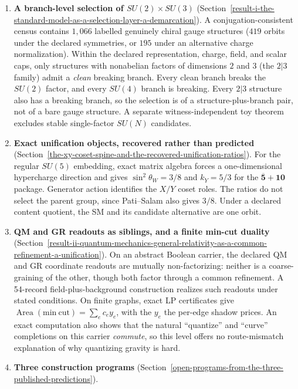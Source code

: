 \documentclass[11pt]{article}
\theoremstyle{definition}
\begin{document}
\begin{enumerate}
\item
  \textbf{A branch-level selection of \(SU(2)\times SU(3)\)} (Section~\ref{result-i-the-standard-model-as-a-selection-layer-a-demarcation}).
  A conjugation-consistent census contains \(1{,}066\) labelled genuinely chiral gauge structures (\(419\) orbits under
  the declared symmetries, or \(195\) under an alternative charge normalization). Within the declared representation,
  charge, field, and scalar caps, only structures with nonabelian factors of dimensions \(2\) and \(3\) (the
  \(2|3\) family) admit a \emph{clean} breaking branch. Every clean branch breaks the \(SU(2)\) factor, and every
  \(SU(4)\) branch is breaking. Every \(2|3\) structure also has a breaking branch, so the selection is of a
  structure-plus-branch pair, not of a bare gauge structure. A separate witness-independent toy theorem excludes stable
  single-factor \(SU(N)\) candidates.
\item
  \textbf{Exact unification objects, recovered rather than predicted} (Section~\ref{the-xy-coset-spine-and-the-recovered-unification-ratios}).
  For the regular \(SU(5)\) embedding, exact matrix algebra forces a one-dimensional hypercharge direction and gives
  \(\sin^2\theta_W=3/8\) and \(k_Y=5/3\) for the \(\overline{\mathbf5}+\mathbf{10}\) package. Generator action
  identifies the \(X/Y\) coset roles. The ratios do not select the parent group, since Pati--Salam also gives \(3/8\).
  Under a declared content quotient, the SM and its candidate alternative are one orbit.
\item
  \textbf{QM and GR readouts as siblings, and a finite min-cut duality} (Section~\ref{result-ii-quantum-mechanics-general-relativity-as-a-common-refinement-a-unification}).
  On an abstract Boolean carrier, the declared QM and GR coordinate readouts are mutually non-factorizing: neither is a
  coarse-graining of the other, though both factor through a common refinement. A 54-record field-plus-background
  construction realizes such readouts under stated conditions. On finite graphs, exact LP certificates give
  \(\operatorname{Area}(\mathrm{min\ cut})=\sum_e c_e y_e\), with the \(y_e\) the per-edge shadow prices. An exact
  computation also shows that the natural ``quantize'' and ``curve'' completions on this carrier \emph{commute}, so
  this level offers no route-mismatch explanation of why quantizing gravity is hard.
\item
  \textbf{Three construction programs} (Section~\ref{open-programs-from-the-three-published-predictions}).

\end{enumerate}
\end{document}
